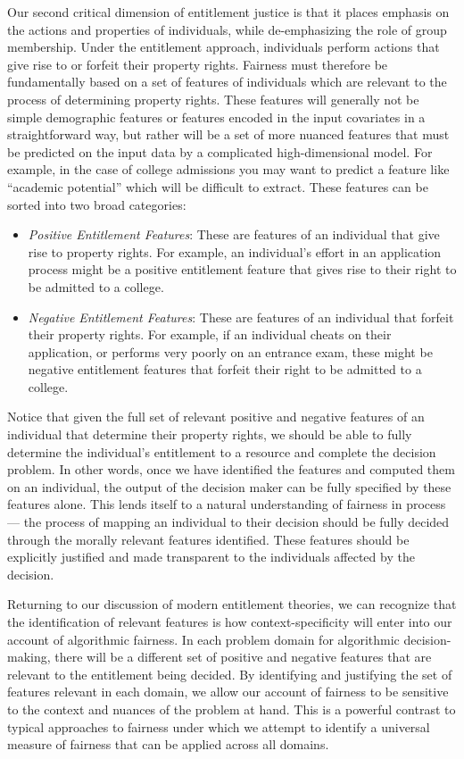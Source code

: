 Our second critical dimension of entitlement justice is that it places
emphasis on the actions and properties of individuals, while de-emphasizing
the role of group membership. Under the entitlement approach, individuals
perform actions that give rise to or forfeit their property rights. Fairness
must therefore be fundamentally based on a set of features of individuals which
are relevant to the process of determining property rights. These features will
generally not be simple demographic features or features encoded in the input
covariates in a straightforward way, but rather will be a set of more nuanced
features that must be predicted on the input data by a complicated
high-dimensional model. For example, in the case of college admissions you may
want to predict a feature like ``academic potential'' which will be difficult to
extract. These features can be sorted into two broad categories:
\begin{itemize}
    \item \emph{Positive Entitlement Features}: These are features of an
    individual that give rise to property rights. For example, an
    individual's effort in an application process might be a positive
    entitlement feature that gives rise to their right to be admitted
    to a college.
    \item \emph{Negative Entitlement Features}: These are features of an
    individual that forfeit their property rights. For example, if
    an individual cheats on their application, or performs very poorly on an
    entrance exam, these might be negative entitlement features that
    forfeit their right to be admitted to a college. 
\end{itemize}
Notice that given the full set of relevant positive and negative features of an
individual that determine their property rights, we should be able to fully
determine the individual's entitlement to a resource and complete the decision
problem. In other words, once we have identified the features and computed
them on an individual, the output of the decision maker can be fully specified
by these features alone. This lends itself to a natural understanding of
fairness in process — the process of mapping an individual to their decision
should be fully decided through the morally relevant features identified. These
features should be explicitly justified and made transparent to the
individuals affected by the decision. 

Returning to our discussion of modern entitlement theories, we can recognize
that the identification of relevant features is how context-specificity will
enter into our account of algorithmic fairness. In each problem domain for 
algorithmic decision-making, there will be a different set of positive and
negative features that are relevant to the entitlement being decided. By
identifying and justifying the set of features relevant in each domain, we
allow our account of fairness to be sensitive to the context and nuances of the
problem at hand. This is a powerful contrast to typical approaches to fairness
under which we attempt to identify a universal measure of fairness that can be
applied across all domains.

